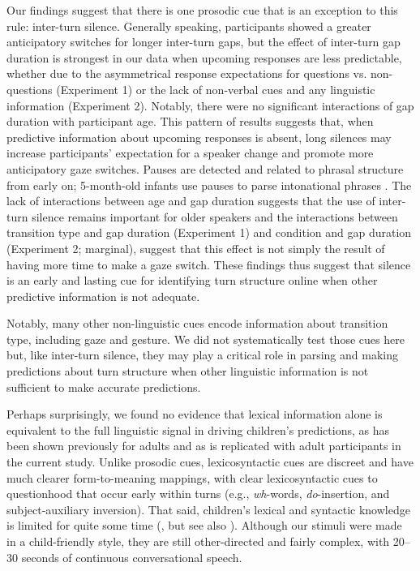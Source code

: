 \documentclass[authoryear, 12pt]{elsarticle}
\begin{document}
Our findings suggest that there is one prosodic cue that is an exception to this rule: inter-turn silence. Generally speaking, participants showed a greater anticipatory switches for longer inter-turn gaps, but the effect of inter-turn gap duration is strongest in our data when upcoming responses are less predictable, whether due to the asymmetrical response expectations for questions vs. non-questions (Experiment 1) or the lack of non-verbal cues and any linguistic information (Experiment 2). Notably, there were no significant interactions of gap duration with participant age. This pattern of results suggests that, when predictive information about upcoming responses is absent, long silences may increase participants' expectation for a speaker change and promote more anticipatory gaze switches. Pauses are detected and related to phrasal structure from early on; 5-month-old infants use pauses to parse intonational phrases \citep{mannel2009}. The lack of interactions between age and gap duration suggests that the use of inter-turn silence remains important for older speakers and the interactions between transition type and gap duration (Experiment 1) and condition and gap duration (Experiment 2; marginal), suggest that this effect is not simply the result of having more time to make a gaze switch. These findings thus suggest that silence is an early and lasting cue for identifying turn structure online when other predictive information is not adequate.

Notably, many other non-linguistic cues encode information about transition type, including gaze and gesture. We did not systematically test those cues here but, like inter-turn silence, they may play a critical role in parsing and making predictions about turn structure when other linguistic information is not sufficient to make accurate predictions.


Perhaps surprisingly, we found no evidence that lexical information alone is equivalent to the full linguistic signal in driving children's predictions, as has been shown previously for adults \citep{magyari2012, de-ruiter2006} and as is replicated with adult participants in the current study. Unlike prosodic cues, lexicosyntactic cues are discreet and have much clearer form-to-meaning mappings, with clear lexicosyntactic cues to questionhood that occur early within turns (e.g., \textit{wh}-words, \textit{do}-insertion, and subject-auxiliary inversion). That said, children's lexical and syntactic knowledge is limited for quite some time (\citealp{tomasello1999}, but see also \citealp{bergelson2013, shi2010}). Although our stimuli were made in a child-friendly style, they are still other-directed and fairly complex, with 20--30 seconds of continuous conversational speech.
\end{document}
